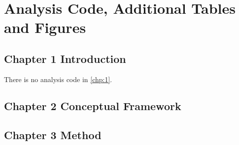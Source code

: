 \chapter{Analysis Code, Additional Tables and Figures}

\begin{singlespace}

\section{Chapter 1 Introduction}

There is no analysis code in \cref{chp:1}.

\section{Chapter 2 Conceptual Framework}

%

%

%

%

\section{Chapter 3 Method}




\end{singlespace}
